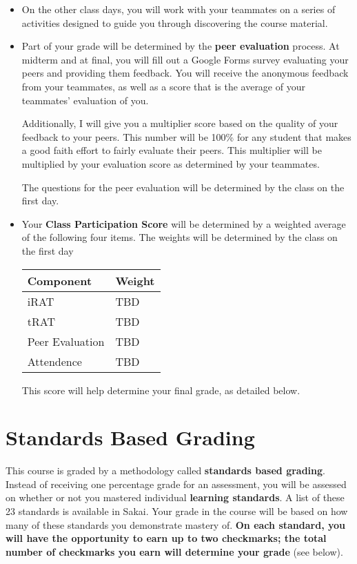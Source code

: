 \documentclass[letterpaper]{article}
\begin{document}
{\begin{itemize}
\item On the other class days, you will work with your teammates on a series of activities designed to guide you through discovering the course material.

\item Part of your grade will be determined by the {\bf peer evaluation} process.  At midterm and at final, you will fill out a Google Forms survey evaluating your peers and providing them feedback.  You will receive the anonymous feedback from your teammates, as well as a score that is the average of your teammates' evaluation of you.

Additionally, I will give you a multiplier score based on the quality of your feedback to your peers.  This number will be 100\% for any student that makes a good faith effort to fairly evaluate their peers.  This multiplier will be multiplied by your evaluation score as determined by your teammates. 

The questions for the peer evaluation will be determined by the class on the first day. 

\item Your {\bf Class Participation Score} will be determined by a weighted average of the following four items.  The weights will be determined by the class on the first day

\begin{center}
\begin{tabular}{l|l}
Component & Weight \\ \hline \hline 
iRAT & TBD \\ \hline
tRAT & TBD\\ \hline
Peer Evaluation & TBD \\ \hline
Attendence & TBD\\ \hline

\end{tabular}
\end{center}

This score will help determine your final grade, as detailed below.
\end{itemize}
}

\section*{\fontsize{12}{15}\selectfont Standards Based Grading}
This course is graded by a methodology called {\bf standards based grading}.  Instead of receiving one percentage grade for an assessment, you will be assessed on whether or not you mastered individual {\bf learning standards}.  A list of these 23 standards is available in Sakai.  Your grade in the course will be based on how many of these standards you demonstrate mastery of.  {\bf On each standard, you will have the opportunity to earn up to two checkmarks; the total number of checkmarks you earn will determine your grade} (see below).
 
\end{document}
